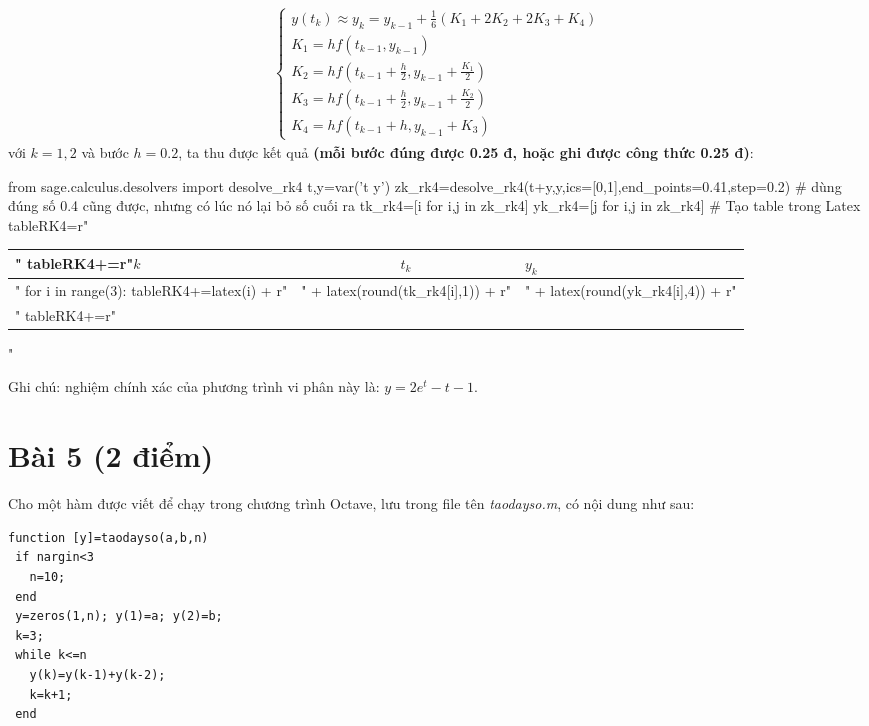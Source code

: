 \documentclass[12pt]{article}
\begin{document}
\begin{enumerate}[a).]
\begin{align*}
\left\lbrace \begin{array}{l}
               y(t_k) \approx y_k = y_{k-1} + \frac{1}{6}(K_1 + 2K_2 + 2K_3 + K_4) \\
               K_1 = h f(t_{k-1},y_{k-1}) \\
               K_2 = h f\left(t_{k-1}+\frac{h}{2},y_{k-1} + \frac{K_1}{2}\right) \\
               K_3 = h f\left(t_{k-1}+\frac{h}{2},y_{k-1} + \frac{K_2}{2}\right) \\
               K_4 = h f\left(t_{k-1}+h,y_{k-1} + K_3\right)
               \end{array}
\right.
\end{align*}
với $k=1, 2$ và bước $h=0.2$, ta thu được kết quả \textbf{(mỗi bước đúng được 0.25 đ, hoặc ghi được công thức 0.25 đ)}:
\begin{sagesilent}
 from sage.calculus.desolvers import desolve_rk4
 t,y=var('t y')
 zk_rk4=desolve_rk4(t+y,y,ics=[0,1],end_points=0.41,step=0.2) # dùng đúng số 0.4 cũng được, nhưng có lúc nó lại bỏ số cuối ra
 tk_rk4=[i for i,j in zk_rk4]
 yk_rk4=[j for i,j in zk_rk4]
 # Tạo table trong Latex
 tableRK4=r"\begin{tabular}{l|c|l}"
 tableRK4+=r"$k$ & $t_k$ & $y_k$ \\ \hline"
 for i in range(3):
   tableRK4+=latex(i) + r"&" + latex(round(tk_rk4[i],1)) + r"&" + latex(round(yk_rk4[i],4)) + r"\\"
 tableRK4+=r"\end{tabular}"
\end{sagesilent}

  \begin{center}  \end{center} 

  Ghi chú: nghiệm chính xác của phương trình vi phân này là: $y=2 e^t - t - 1$.

\end{enumerate}

\section{Bài 5 (2 điểm)}

Cho một hàm được viết để chạy trong chương trình Octave, lưu trong file tên \textit{taodayso.m}, có nội dung như sau:
\begin{verbatim}
function [y]=taodayso(a,b,n)
 if nargin<3
   n=10;
 end
 y=zeros(1,n); y(1)=a; y(2)=b;
 k=3;
 while k<=n
   y(k)=y(k-1)+y(k-2);
   k=k+1;
 end 
\end{verbatim}
\end{document}
